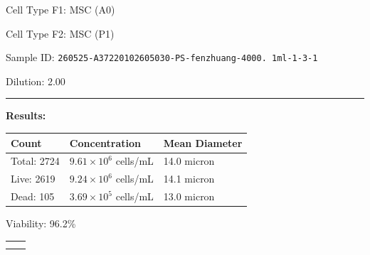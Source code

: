 \documentclass[UTF8,10pt,a4paper,fontset=fandol]{ctexart}
\newcommand{\fieldvalue}[1]{#1}
\begin{document}
\medskip

\noindent
Cell Type F1: 
\fieldvalue{MSC (A0)}

\noindent
Cell Type F2: 
\fieldvalue{MSC (P1)}

\medskip

\noindent
Sample ID:
\fieldvalue{\texttt{260525-A37220102605030-PS-fenzhuang-4000. 1ml-1-3-1}}

\noindent
Dilution:
\fieldvalue{2.00}

\bigskip
\hrule
\bigskip

\noindent\textbf{Results:}

\medskip

\noindent
\begin{tabularx}{\textwidth}{@{}lX X@{}}
\textbf{Count} & \textbf{Concentration} & \textbf{Mean Diameter} \\
\hline
Total:
\fieldvalue{2724}
&
\fieldvalue{$9.61 \times 10^{6}$ cells/mL}
&
\fieldvalue{14.0 micron}
\\
Live:
\fieldvalue{2619}
&
\fieldvalue{$9.24 \times 10^{6}$ cells/mL}
&
\fieldvalue{14.1 micron}
\\
Dead:
\fieldvalue{105}
&
\fieldvalue{$3.69 \times 10^{5}$ cells/mL}
&
\fieldvalue{13.0 micron}
\end{tabularx}

\medskip

Viability:
\fieldvalue{96.2\%}

\bigskip

\noindent
\begin{tabular}{cc}
\fbox{\rule{0pt}{115pt}\rule{175pt}{0pt}}
&
\fbox{\rule{0pt}{115pt}\rule{175pt}{0pt}}
\\[18pt]
\fbox{\rule{0pt}{115pt}\rule{175pt}{0pt}}
&
\fbox{\rule{0pt}{115pt}\rule{175pt}{0pt}}
\end{tabular}
\end{document}

